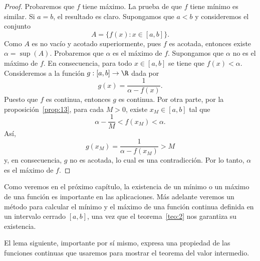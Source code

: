 \documentclass[12pt,a4paper]{book}
\begin{document}
    \begin{proof}
        Probaremos que $f$ tiene máximo. La prueba de que $f$ tiene
        mínimo es similar. Si $a=b$, el resultado es claro. Supongamos que $a<b$ y
        consideremos el conjunto
        \begin{equation*}
            A=\{f(x):x\in[a,b]\}.
        \end{equation*}
        Como $A$ es no vacío y acotado superiormente, pues $f$ es acotada, entonces
        existe $\alpha=\sup(A)$. Probaremos que $\alpha$ es el máximo de $f$. Supongamos que
        $\alpha$ no es el máximo de $f$. En consecuencia, para todo $x\in[a,b]$ se tiene que
        $f(x)<\alpha$. Consideremos a la función $g:[a,b]\to\R$ dada por
        \begin{equation*}
            g(x)=\frac{1}{\alpha-f(x)}.
        \end{equation*}
        Puesto que $f$ es continua, entonces $g$ es continua. Por otra parte, por la
        proposición~\ref{prop:13}, para cada $M>0$, existe $x_{M}\in[a,b]$ tal que
        \begin{equation*}
            \alpha-\frac{1}{M}<f(x_{M})<\alpha.
        \end{equation*}
        Así,
        \begin{equation*}
            g(x_{M})=\frac{1}{\alpha-f(x_{M})}>M
        \end{equation*}
        y, en consecuencia, $g$ no es acotada, lo cual es una contradicción. Por lo tanto,
        $\alpha$ es el máximo de $f$.
    \end{proof}

    Como veremos en el próximo capítulo, la existencia de un mínimo o un
    máximo de una función es importante en las aplicaciones. Más adelante veremos
    un método para calcular el mínimo y el máximo de una función continua
    definida en un intervalo cerrado $[a,b]$, una vez que el teorema~\ref{teo:2} nos garantiza
    su existencia.

    El lema siguiente, importante por sí mismo, expresa una propiedad de las
    funciones continuas que usaremos para mostrar el teorema del valor intermedio.
\end{document}
